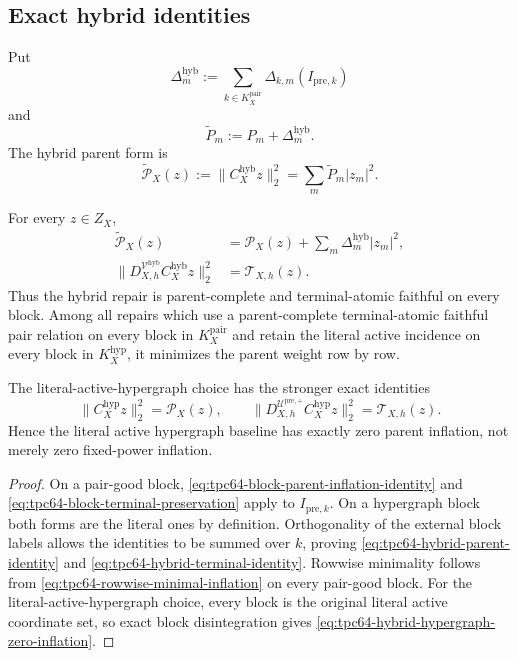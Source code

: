 \subsection{Exact hybrid identities}

Put
\begin{equation}
 \Delta_m^{\mathrm{hyb}}
 :=
 \sum_{k\in K_X^{\mathrm{pair}}}
 \Delta_{k,m}(I_{\mathrm{pre},k})
 \label{eq:tpc64-hybrid-added-parent-mass}
\end{equation}
and
\begin{equation}
 \widetilde P_m
 :=P_m+\Delta_m^{\mathrm{hyb}}.
 \label{eq:tpc64-hybrid-row-parent}
\end{equation}
The hybrid parent form is
\begin{equation}
 \widetilde{\mathcal P}_X(z)
 :=\|C_X^{\mathrm{hyb}}z\|_2^2
 =\sum_m\widetilde P_m|z_m|^2.
 \label{eq:tpc64-hybrid-parent-form}
\end{equation}

\begin{theorem}
\label{thm:tpc64-canonical-hybrid-repair}
For every \(z\in Z_X\),
\begin{align}
 \widetilde{\mathcal P}_X(z)
 &=
 \mathcal P_X(z)
 +\sum_m\Delta_m^{\mathrm{hyb}}|z_m|^2,
 \label{eq:tpc64-hybrid-parent-identity}\\
 \|D_{X,h}^{\mathcal V^{\mathrm{hyb}}}C_X^{\mathrm{hyb}}z\|_2^2
 &=\mathcal T_{X,h}(z).
 \label{eq:tpc64-hybrid-terminal-identity}
\end{align}
Thus the hybrid repair is parent-complete and terminal-atomic faithful on
every block.  Among all repairs which use a parent-complete
terminal-atomic faithful pair relation on every block in
\(K_X^{\mathrm{pair}}\) and retain the literal active incidence on every block in
\(K_X^{\mathrm{hyp}}\), it minimizes the parent weight row by row.

The literal-active-hypergraph choice has the stronger exact identities
\begin{equation}
 \boxed{
 \|C_X^{\mathrm{hyp}}z\|_2^2=\mathcal P_X(z),
 \qquad
 \|D_{X,h}^{\mathcal U^{\mathrm{pre},+}}C_X^{\mathrm{hyp}}z\|_2^2
 =\mathcal T_{X,h}(z).}
 \label{eq:tpc64-hybrid-hypergraph-zero-inflation}
\end{equation}
Hence the literal active hypergraph baseline has exactly zero parent inflation,
not merely zero fixed-power inflation.
\end{theorem}

\begin{proof}
On a pair-good block,
\eqref{eq:tpc64-block-parent-inflation-identity} and
\eqref{eq:tpc64-block-terminal-preservation} apply to
\(I_{\mathrm{pre},k}\).  On a hypergraph block both forms are the literal
ones by definition.  Orthogonality of the external block labels allows
the identities to be summed over \(k\), proving
\eqref{eq:tpc64-hybrid-parent-identity} and
\eqref{eq:tpc64-hybrid-terminal-identity}.  Rowwise minimality follows
from \eqref{eq:tpc64-rowwise-minimal-inflation} on every pair-good block.
For the literal-active-hypergraph choice, every block is the original
literal active coordinate set,
so exact block disintegration gives
\eqref{eq:tpc64-hybrid-hypergraph-zero-inflation}.
\end{proof}

